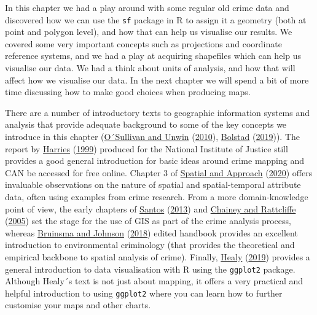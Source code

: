 \documentclass[
]{book}
\begin{document}
In this chapter we had a play around with some regular old crime data and discovered how we can use the \texttt{sf} package in R to assign it a geometry (both at point and polygon level), and how that can help us visualise our results. We covered some very important concepts such as projections and coordinate reference systems, and we had a play at acquiring shapefiles which can help us visualise our data. We had a think about units of analysis, and how that will affect how we visualise our data. In the next chapter we will spend a bit of more time discussing how to make good choices when producing maps.

There are a number of introductory texts to geographic information systems and analysis that provide adequate background to some of the key concepts we introduce in this chapter (\protect\hyperlink{ref-OSullivan_2010}{O´Sullivan and Unwin} (\protect\hyperlink{ref-OSullivan_2010}{2010}), \protect\hyperlink{ref-Bolstad_2019}{Bolstad} (\protect\hyperlink{ref-Bolstad_2019}{2019})). The report by \protect\hyperlink{ref-Harries_1999}{Harries} (\protect\hyperlink{ref-Harries_1999}{1999}) produced for the National Institute of Justice still provides a good general introduction for basic ideas around crime mapping and CAN be accessed for free online. Chapter 3 of \protect\hyperlink{ref-Haining_2020}{Spatial and Approach} (\protect\hyperlink{ref-Haining_2020}{2020}) offers invaluable observations on the nature of spatial and spatial-temporal attribute data, often using examples from crime research. From a more domain-knowledge point of view, the early chapters of \protect\hyperlink{ref-Boba_2013}{Santos} (\protect\hyperlink{ref-Boba_2013}{2013}) and \protect\hyperlink{ref-Chainey_2005}{Chainey and Rattcliffe} (\protect\hyperlink{ref-Chainey_2005}{2005}) set the stage for the use of GIS as part of the crime analysis process, whereas \protect\hyperlink{ref-Bruinsma_2018}{Bruinsma and Johnson} (\protect\hyperlink{ref-Bruinsma_2018}{2018}) edited handbook provides an excellent introduction to environmental criminology (that provides the theoretical and empirical backbone to spatial analysis of crime). Finally, \protect\hyperlink{ref-Healy_2019}{Healy} (\protect\hyperlink{ref-Healy_2019}{2019}) provides a general introduction to data visualisation with R using the \texttt{ggplot2} package. Although Healy´s text is not just about mapping, it offers a very practical and helpful introduction to using \texttt{ggplot2} where you can learn how to further customise your maps and other charts.
\end{document}
